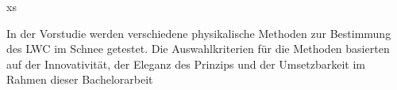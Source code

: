 xs

In der Vorstudie werden verschiedene physikalische Methoden zur Bestimmung des LWC im Schnee getestet. Die Auswahlkriterien für die Methoden basierten auf der Innovativität, der Eleganz des Prinzips und der Umsetzbarkeit im Rahmen dieser Bachelorarbeit
